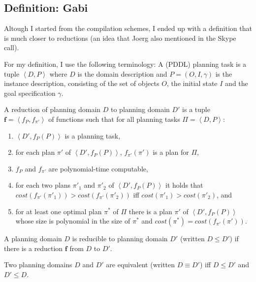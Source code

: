 

\subsection{Definition: Gabi}
\label{definition-gabi}

Altough I started from the compilation schemes, I ended up with a definition
that is much closer to reductions (an idea that Joerg also mentioned in the
Skype call).

For my definition, I use the following terminology:
A (PDDL) planning task is a tuple $\left<D, P\right>$
where $D$ is the domain description and $P=(O,I,\gamma)$ 
is the instance description, consisting of the set of objects $O$, the
initial state $I$ and the goal specification $\gamma$. 

\begin{definition}[Reduction]
A reduction of planning domain $D$ to planning domain $D'$ is a tuple
$\mathbf f=\left<f_P, f_{\pi'}\right>$ of functions
such that for all planning tasks $\Pi = \left<D, P\right>$:
\begin{enumerate}
    \item $\left<D', f_P(P)\right>$ is a planning task,
    \item for each plan $\pi'$ of $\left<D', f_P(P)\right>$, $f_{\pi'}(\pi')$ is
          a plan for $\Pi$,
    \item $f_P$ and $f_{\pi'}$ are polynomial-time computable,
    \item for each two plans $\pi'_1$ and $\pi'_2$ of $\left<D', f_P(P)\right>$
          it holds that $\textit{cost}(f_{\pi'}(\pi'_1)) >
          \textit{cost}(f_{\pi'}(\pi'_2))$ iff $\textit{cost}(\pi'_1) >
          \textit{cost}(\pi'_2)$, and
    \item for at least one optimal plan $\pi^*$ of $\Pi$ there is a
          plan $\pi'$ of $\left<D', f_P(P)\right>$
          whose size is polynomial in the size of $\pi^*$ and
          $\textit{cost}(\pi^*) = \textit{cost}(f_{\pi'}(\pi'))$.
\end{enumerate}
\end{definition}

\begin{definition}[Reducibility]
A planning domain $D$ is reducible to planning domain $D'$ (written $D\leq D'$)
if there is a reduction $\mathbf f$ from $D$ to $D'$.
\end{definition}

\begin{definition}
Two planning domains $D$ and $D'$ are equivalent (written $D\equiv D'$) iff
$D\leq D'$ and $D'\leq D$.
\end{definition}

